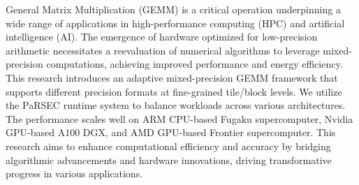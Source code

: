 General Matrix Multiplication (GEMM) is a critical operation underpinning a wide range of applications in high-performance computing (HPC) and artificial intelligence (AI). The emergence of hardware optimized for low-precision arithmetic necessitates a reevaluation of numerical algorithms to leverage mixed-precision computations, achieving improved performance and energy efficiency. This research introduces an adaptive mixed-precision GEMM framework that supports different precision formats at fine-grained tile/block levels. We utilize the PaRSEC runtime system to balance workloads across various architectures. The performance scales well on ARM CPU-based Fugaku supercomputer, Nvidia GPU-based A100 DGX, and AMD GPU-based Frontier supercomputer. This research aims to enhance computational efficiency and accuracy by bridging algorithmic advancements and hardware innovations, driving transformative progress in various applications.
